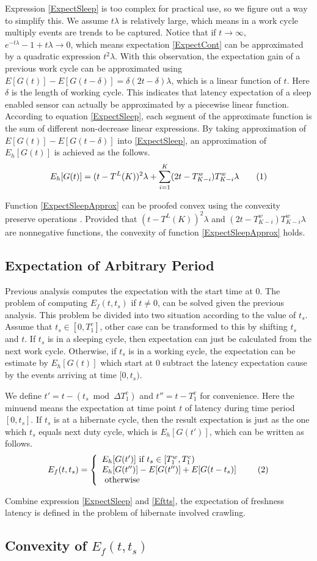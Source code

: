 \documentclass[conference]{IEEEtran}
\newcommand\numberthis{\addtocounter{equation}{1}\tag{\theequation}}
\begin{document}
Expression \eqref{ExpectSleep} is too complex for practical use, so we figure out a way to simplify this. 
We assume $t\lambda$ is relatively large, which means in a work cycle multiply events are trends to be captured.
Notice that if $t\rightarrow \infty$, $e^{-t\lambda}-1+t \lambda \rightarrow 0$, which means expectation \eqref{ExpectCont} can be approximated by a quadratic expression $t^2\lambda$.
With this observation, the expectation gain of a previous work cycle can be approximated using $E[G(t)]-E[G(t-\delta)] = \delta (2 t - \delta)\lambda$, which is a linear function of $t$. Here $\delta$ is the length of working cycle.
This indicates that latency expectation of a sleep enabled sensor can actually be approximated by a piecewise linear function.
According to equation \eqref{ExpectSleep}, each segment of the approximate function is the sum of different non-decrease linear expressions.
By taking approximation of $E[G(t)]-E[G(t-\delta)]$ into \eqref{ExpectSleep}, an approximation of $E_h[G(t)]$ is achieved as the follows.
\begin{align*}
E_h[G(t)] = (t-T^{L}(K))^2\lambda + \sum_{i=1}^{K} (2 t - T^{w}_{K-i})T^{w}_{K-i}\lambda
\numberthis 
\label{ExpectSleepApprox}
\end{align*}

Function \eqref{ExpectSleepApprox} can be proofed convex using the convexity preserve operations \cite{boyd2004convex}. Provided that $(t-T^{L}(K))^2\lambda$ and $(2 t - T^{w}_{K-i})T^{w}_{K-i}\lambda$ are nonnegative functions, the convexity of function \eqref{ExpectSleepApprox} holds.

\subsection{Expectation of Arbitrary Period}
Previous analysis computes the expectation with the start time at $0$. The problem of computing $E_f(t,t_s)$ if $t\ne0$, can be solved given the previous analysis. This problem be divided into two situation according to the value of $t_s$.
Assume that $t_s\in [0,T^{c}_{1}]$, other case can be transformed to this by shifting $t_s$ and $t$.
If $t_s$ is in a sleeping cycle, then expectation can just be calculated from the next work cycle.
Otherwise, if $t_s$ is in a working cycle, the expectation can be estimate by $E_h[G(t)]$ which start at $0$ subtract the latency expectation cause by the events arriving at time $[0, t_s)$.

We define $t'=t-(t_s\bmod\Delta T^{c}_{1})$ and $t''=t-T^{c}_{1}$ for convenience. 
Here the minuend means the expectation at time point $t$ of latency during time period $[0, t_s]$.
If $t_s$ is at a hibernate cycle, then the result expectation is just as the one which $t_s$ equals next duty cycle, which is $E_h[G(t')]$, which can be written as follows.
\[E_f(t,t_s)=\left\{
    \begin{array}{lr}
    E_h[G(t')]\text{ if } t_s\in [T^{w}_{1}, T^{c}_{1})\\
    E_h[G(t'')]-E[G(t'')]+E[G(t-t_s)]\\
    \text{ otherwise }
    \end{array}\numberthis \label{Eftts}
    \right.
\]

Combine expression \eqref{ExpectSleep} and \eqref{Eftts}, the expectation of freshness latency is defined in the problem of hibernate involved crawling.

\subsection{Convexity of $E_f(t,t_s)$}
\end{document}
